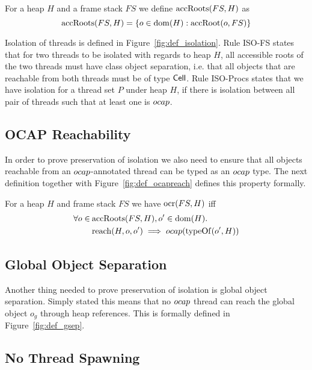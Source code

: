 \begin{definition}
  For a heap $H$ and a frame stack $FS$ we define $\mbox{$\mathrm{accRoots}$}{(FS, H)}$ as
  \begin{equation}
    \mbox{$\mathrm{accRoots}$}{(FS, H)} = \left\{ o \in \mbox{$\mathrm{dom}$}{(H)}: \mbox{$\mathrm{accRoot}$}{(o, FS)} \right\}
  \end{equation}
\end{definition}

Isolation of threads is defined in Figure~\ref{fig:def_isolation}. Rule {\sc
ISO-FS} states that for two threads to be isolated with regards to heap $H$, all
accessible roots of the two threads must have class object separation, i.e. that
all objects that are reachable from both threads must be of type $\mbox{$\mathsf{Cell}$}$.
Rule {\sc ISO-Procs} states that we have isolation for a thread set $P$ under
heap $H$, if there is isolation between all pair of threads such that at least
one is $\mbox{$ocap$}$.

\subsection{OCAP Reachability}%
\label{sub:ocap_reachability}

In order to prove preservation of isolation we also need to ensure that all
objects reachable from an $\mbox{$ocap$}$-annotated thread can be typed as an $\mbox{$ocap$}$
type. The next definition together with Figure~\ref{fig:def_ocapreach} defines
this property formally.
\begin{definition}
  For a heap $H$ and frame stack $FS$ we have $\mbox{$\mathrm{ocr}$}{(FS,H)}$ iff
  \begin{align}
    \label{eq:ocr_def}
    \forall o \in \: &\mbox{$\mathrm{accRoots}$}(FS,H), o' \in \mbox{$\mathrm{dom}$}(H). \notag\\
    &\mbox{$\mathrm{reach}$}{(H, o, o')} \implies \mbox{$ocap$}{(\mbox{$\mathrm{typeOf}$}{(o', H)})}
  \end{align}
\end{definition}

\subsection{Global Object Separation}%
\label{sub:global_object_separation}

Another thing needed to prove preservation of isolation is global object
separation. Simply stated this means that no $\mbox{$ocap$}$ thread can reach the global
object $o_g$ through heap references. This is formally defined in
Figure~\ref{fig:def_gsep}.

\subsection{No Thread Spawning}%
\label{sub:no_thread_spawning}

